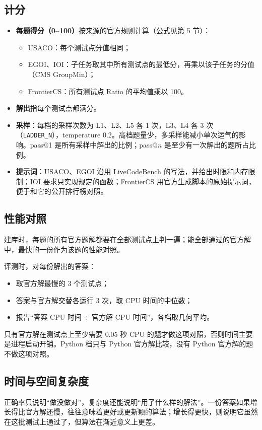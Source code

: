 \documentclass[11pt,a4paper,fontset=none]{ctexart}
\begin{document}
\subsection{计分}
\begin{itemize}
  \item \textbf{每题得分（0--100）}按来源的官方规则计算（公式见第 5 节）：
    \begin{itemize}
      \item USACO：每个测试点分值相同；
      \item EGOI、IOI：子任务取其中所有测试点的最低分，再乘以该子任务的分值（CMS GroupMin）；
      \item FrontierCS：所有测试点 Ratio 的平均值乘以 100。
    \end{itemize}
  \item \textbf{解出}指每个测试点都满分。
  \item \textbf{采样}：每档的采样次数为 L1、L2、L5 各 1 次，L3、L4 各 3 次（\texttt{LADDER\_N}），temperature 0.2。高档题量少，多采样能减小单次运气的影响。pass@1 是所有采样中解出的比例；pass@$n$ 是至少有一次解出的题所占比例。
  \item \textbf{提示词}：USACO、EGOI 沿用 LiveCodeBench 的写法，并给出时限和内存限制；IOI 要求只实现规定的函数；FrontierCS 用官方生成脚本的原始提示词，便于和它的公开排行榜对照。
\end{itemize}

\subsection{性能对照}
建库时，每题的所有官方题解都要在全部测试点上判一遍；能全部通过的官方解中，最快的一份作为该题的性能对照。

评测时，对每份解出的答案：
\begin{itemize}
  \item 取官方解最慢的 3 个测试点；
  \item 答案与官方解交替各运行 3 次，取 CPU 时间的中位数；
  \item 报告“答案 CPU 时间 ÷ 官方解 CPU 时间”，各档取几何平均。
\end{itemize}
只有官方解在测试点上至少需要 0.05 秒 CPU 的题才做这项对照，否则时间主要是进程启动开销。Python 档只与 Python 官方解比较，没有 Python 官方解的题不做这项对照。

\subsection{时间与空间复杂度}
正确率只说明“做没做对”，复杂度还能说明“用了什么样的解法”。一份答案如果增长得比官方解还慢，往往意味着更好或更新颖的算法；增长得更快，则说明它虽然在这批测试上通过了，但算法在渐近意义上更差。
\end{document}
